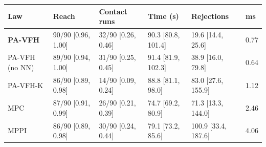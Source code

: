 \scriptsize
\setlength{\tabcolsep}{3pt}
\begin{tabular}{llllll}
\toprule
Law & Reach & Contact runs & Time (s) & Rejections & ms \\
\midrule
\textbf{PA-VFH} & 90/90 [0.96, 1.00] & 32/90 [0.26, 0.46] & 90.3 [80.8, 101.4] & 19.6 [14.4, 25.6] & 0.77 \\
PA-VFH (no NN) & 89/90 [0.94, 1.00] & 31/90 [0.25, 0.45] & 91.4 [81.9, 102.3] & 38.9 [16.0, 79.8] & 0.64 \\
PA-VFH-K & 86/90 [0.89, 0.98] & 14/90 [0.09, 0.24] & 88.8 [81.1, 98.0] & 83.0 [27.6, 155.9] & 1.12 \\
MPC & 87/90 [0.91, 0.99] & 26/90 [0.21, 0.39] & 74.7 [69.2, 80.9] & 71.3 [13.3, 144.0] & 2.46 \\
MPPI & 86/90 [0.89, 0.98] & 30/90 [0.24, 0.44] & 79.1 [73.2, 85.6] & 100.9 [33.4, 187.6] & 4.06 \\
\bottomrule
\end{tabular}
